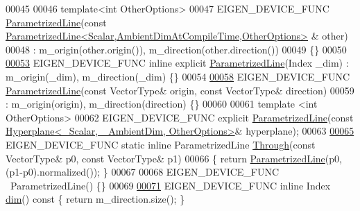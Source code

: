 \begin{DoxyCode}
00045   
00046   \textcolor{keyword}{template}<\textcolor{keywordtype}{int} OtherOptions>
00047   EIGEN\_DEVICE\_FUNC \hyperlink{group___geometry___module_a7c23f36d93cf3b3c2b37fd9f9eda5685}{ParametrizedLine}(\textcolor{keyword}{const} 
      \hyperlink{group___geometry___module_class_eigen_1_1_parametrized_line}{ParametrizedLine<Scalar,AmbientDimAtCompileTime,OtherOptions>}
      & other)
00048    : m\_origin(other.origin()), m\_direction(other.direction())
00049   \{\}
00050 
\hyperlink{group___geometry___module_ac4ba4fe484f3a3abf78edec8c60ea13a}{00053}   EIGEN\_DEVICE\_FUNC \textcolor{keyword}{inline} \textcolor{keyword}{explicit} \hyperlink{group___geometry___module_ac4ba4fe484f3a3abf78edec8c60ea13a}{ParametrizedLine}(Index \_dim) : m\_origin(\_dim), 
      m\_direction(\_dim) \{\}
00054 
\hyperlink{group___geometry___module_a1b1d3ff9dee6f252f14bc2d8f3f0bb02}{00058}   EIGEN\_DEVICE\_FUNC \hyperlink{group___geometry___module_a1b1d3ff9dee6f252f14bc2d8f3f0bb02}{ParametrizedLine}(\textcolor{keyword}{const} VectorType& origin, \textcolor{keyword}{const} VectorType& direction)
00059     : m\_origin(origin), m\_direction(direction) \{\}
00060 
00061   \textcolor{keyword}{template} <\textcolor{keywordtype}{int} OtherOptions>
00062   EIGEN\_DEVICE\_FUNC \textcolor{keyword}{explicit} \hyperlink{group___geometry___module_a7c23f36d93cf3b3c2b37fd9f9eda5685}{ParametrizedLine}(\textcolor{keyword}{const} 
      \hyperlink{group___geometry___module_class_eigen_1_1_hyperplane}{Hyperplane<\_Scalar, \_AmbientDim, OtherOptions>}& hyperplane);
00063 
\hyperlink{group___geometry___module_a79fec5983b16b02100d67c81407e96fa}{00065}   EIGEN\_DEVICE\_FUNC \textcolor{keyword}{static} \textcolor{keyword}{inline} ParametrizedLine \hyperlink{group___geometry___module_a79fec5983b16b02100d67c81407e96fa}{Through}(\textcolor{keyword}{const} VectorType& p0, \textcolor{keyword}{const} VectorType& 
      p1)
00066   \{ \textcolor{keywordflow}{return} \hyperlink{group___geometry___module_a7c23f36d93cf3b3c2b37fd9f9eda5685}{ParametrizedLine}(p0, (p1-p0).normalized()); \}
00067 
00068   EIGEN\_DEVICE\_FUNC ~ParametrizedLine() \{\}
00069 
\hyperlink{group___geometry___module_a2e8d1ca4d1570e456952b5e979e5171c}{00071}   EIGEN\_DEVICE\_FUNC \textcolor{keyword}{inline} Index \hyperlink{group___geometry___module_a2e8d1ca4d1570e456952b5e979e5171c}{dim}()\textcolor{keyword}{ const }\{ \textcolor{keywordflow}{return} m\_direction.size(); \}

\end{DoxyCode}

